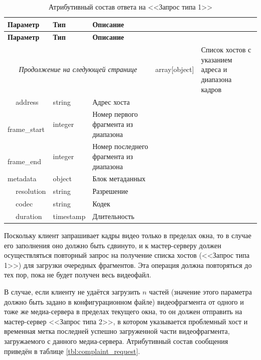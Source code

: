 \begin{longtable}{|p{4cm}|p{3cm}|p{8.5cm}|}
	\caption{Атрибутивный состав ответа на <<Запрос типа 1>>}\label{tbl:get_hosts_response}\\
	\hline
	
	\textbf{Параметр} & \textbf{Тип} & \textbf{Описание}\\ 
	\hline
	\endfirsthead
	
	\hline
	\textbf{Параметр} & \textbf{Тип} & \textbf{Описание}\\ 
	\hline
	\endhead
	
	\hline
	\multicolumn{3}{c}{\textit{Продолжение на следующей странице}}
	\endfoot
	\hline
	\endlastfoot
	
	hosts & 
	array[object] & 
	Список хостов с указанием адреса и диапазона кадров \\
	
	\hline
	\,\,\,\,\,\,\,address & 
	string & 
	Адрес хоста \\
	
	\hline
	\,\,\,\,\,\,\,frame\_start & 
	integer & 
	Номер первого фрагмента из диапазона \\
	
	\hline
	\,\,\,\,\,\,\,frame\_end & 
	integer & 
	Номер последнего фрагмента из диапазона \\
	
	\hline
	metadata & 
	object & 
	Блок метаданных \\
	
	\hline
	\,\,\,\,\,\,\,resolution & 
	string & 
	Разрешение \\
	
	\hline
	\,\,\,\,\,\,\,codec & 
	string & 
	Кодек \\
	
	\hline
	\,\,\,\,\,\,\,duration & 
	timestamp & 
	Длительность \\
\end{longtable}

Поскольку клиент запрашивает кадры видео только в пределах окна, то в случае его заполнения оно должно быть сдвинуто, и к мастер-серверу должен осуществляться повторный запрос на получение списка хостов (<<Запрос типа 1>>) для загрузки очередных фрагментов. Эта операция должна повторяться до тех пор, пока не будет получен весь видеофайл.

В случае, если клиенту не удаётся загрузить $n$ частей (значение этого параметра должно быть задано в конфигурационном файле) видеофрагмента от одного и тоже же медиа-сервера в пределах текущего окна, то он должен отправить на мастер-сервер <<Запрос типа 2>>, в котором указывается проблемный хост и временная метка последней успешно загруженной части видеофрагмента, загружаемого с данного медиа-сервера. Атрибутивный состав сообщения приведён в таблице \ref{tbl:complaint_request}.

